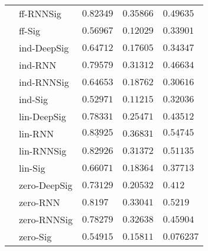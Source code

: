 \begin{tabular}{lllll}
       & ff-RNNSig &                           $ 0.82349 $ &                           $ 0.35866 $ &                          $ 0.49635 $ \\
       & ff-Sig &                           $ 0.56967 $ &                           $ 0.12029 $ &                          $ 0.33901 $ \\
       & ind-DeepSig &                           $ 0.64712 $ &                           $ 0.17605 $ &                          $ 0.34347 $ \\
       & ind-RNN &                           $ 0.79579 $ &                           $ 0.31312 $ &                          $ 0.46634 $ \\
       & ind-RNNSig &                           $ 0.64653 $ &                           $ 0.18762 $ &                          $ 0.30616 $ \\
       & ind-Sig &                           $ 0.52971 $ &                           $ 0.11215 $ &                          $ 0.32036 $ \\
       & lin-DeepSig &                           $ 0.78331 $ &                           $ 0.25471 $ &                          $ 0.43512 $ \\
       & lin-RNN &            $  \underline{ 0.83925 } $ &                           $ 0.36831 $ &           $  \underline{ 0.54745 } $ \\
       & lin-RNNSig &                           $ 0.82926 $ &                           $ 0.31372 $ &                          $ 0.51135 $ \\
       & lin-Sig &                           $ 0.66071 $ &                           $ 0.18364 $ &                          $ 0.37713 $ \\
       & zero-DeepSig &                           $ 0.73129 $ &                           $ 0.20532 $ &                            $ 0.412 $ \\
       & zero-RNN &                            $ 0.8197 $ &                           $ 0.33041 $ &                           $ 0.5219 $ \\
       & zero-RNNSig &                           $ 0.78279 $ &                           $ 0.32638 $ &                          $ 0.45904 $ \\
       & zero-Sig &                           $ 0.54915 $ &                           $ 0.15811 $ &                         $ 0.076237 $ \\
\bottomrule
\end{tabular}
